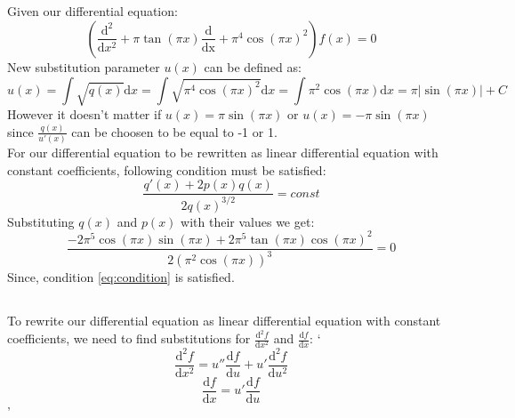 \documentclass[12pt]{article}
\begin{document}
\subsection{}
Given our differential equation:
\begin{equation}
    \left(\frac{\mathrm{d}^2}{\mathrm{d}x^2}+\pi \tan(\pi x)\frac{\mathrm{d}}{\mathrm{dx}}+\pi^4 \cos(\pi x)^2\right)f(x) = 0
\end{equation}
New substitution parameter $u(x)$ can be defined as:
\begin{equation}
    u(x) = \int \sqrt{q(x)}\mathrm{d}x = \int \sqrt{\pi^4 \cos(\pi x)^2} \mathrm{d}x = \int \pi^2 \cos(\pi x)\mathrm{d}x = \pi \left|\sin(\pi x)\right| + C
\end{equation}
However it doesn't matter if $u(x)=\pi \sin(\pi x)$ or $u(x)=-\pi \sin(\pi x)$ since $\frac{q(x)}{u'(x)}$ can be choosen to be equal to -1 or 1.\\
For our differential equation to be rewritten as linear differential equation with constant coefficients, following condition must be satisfied:
\begin{equation}
    \label{eq:condition}
    \frac{q'(x)+2p(x)q(x)}{2q(x)^{3/2}} = const
\end{equation}
Substituting $q(x)$ and $p(x)$ with their values we get:
\begin{equation}
    \frac{-2\pi^5\cos(\pi x)\sin(\pi x)+ 2\pi^5\tan(\pi x)\cos(\pi x)^2}{2\left(\pi^2\cos(\pi x)\right)^3} = 0
\end{equation} 
Since, condition \ref{eq:condition} is satisfied.
\subsection{}
To rewrite our differential equation as linear differential equation with constant coefficients, we need to find substitutions for $\frac{\mathrm{d}^2f}{\mathrm{d}x^2}$ and $\frac{\mathrm{d}f}{\mathrm{d}x}$:
`\begin{equation}
    \frac{\mathrm{d}^2f}{\mathrm{d}x^2} = u''\frac{\mathrm{d}f}{\mathrm{d}u} + u'\frac{\mathrm{d}^2f}{\mathrm{d}u^2}
\end{equation}
\begin{equation}
    \frac{\mathrm{d}f}{\mathrm{d}x} = u'\frac{\mathrm{d}f}{\mathrm{d}u}
\end{equation}'
\end{document}
